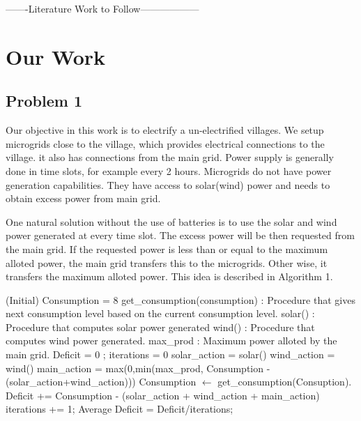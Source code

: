 \documentclass[conference]{IEEEtran}
\begin{document}
-------Literature Work to Follow------------------




\section{Our Work}

\subsection{Problem 1}

Our objective in this work is to electrify a un-electrified villages. We setup microgrids close to the village, which provides electrical connections to the village. it also has connections from the main grid. Power supply is generally done in time slots, for example every 2 hours. Microgrids do not have power generation capabilities. They have access to solar(wind) power and needs to obtain excess power from main grid.  

One natural solution without the use of batteries is to use the solar and wind power generated at every time slot. The excess power will be then requested from the main grid. If the requested power is less than or equal to the maximum alloted power, the main grid transfers this to the microgrids. Other wise, it transfers the maximum alloted power. This idea is described in Algorithm 1.


\begin{algorithm}
\caption{}
\label{greedy}
\begin{algorithmic}[1]
	\State (Initial) Consumption = 8 
    \State get\_consumption(consumption) : Procedure that gives next consumption level based on the current consumption level.
    \State solar() : Procedure that computes solar power generated
    \State wind() : Procedure that computes wind power generated.
    \State max\_prod : Maximum power alloted by the main grid.
    \State Deficit = 0 ; iterations = 0
     \State solar\_action = solar()
     \State wind\_action = wind()
     \State main\_action = max(0,min(max\_prod, Consumption - (solar\_action+wind\_action)))
     \State Consumption $\leftarrow$ get\_consumption(Consuption).
     \State Deficit += Consumption - (solar\_action + wind\_action + main\_action)
     \State iterations += 1;
    \EndProcedure
    \State Average Deficit = Deficit/iterations;
    
\end{algorithmic}
\end{algorithm}
\end{document}
